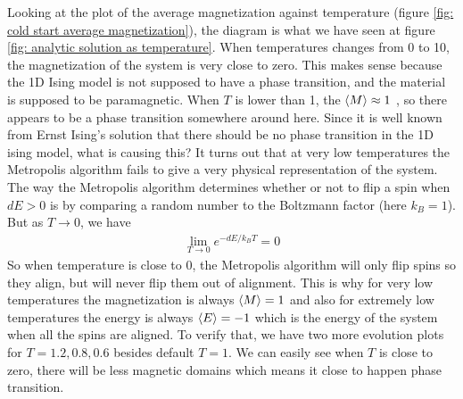 \documentclass[12pt]{article}
\begin{document}
	Looking at the plot of the average magnetization against temperature (figure \ref{fig: cold start average magnetization}), the diagram is what we have seen at figure \ref{fig: analytic solution as temperature}. When temperatures changes from  0 to 10, the magnetization of the system is very close to zero. This makes sense because the 1D Ising model is not supposed to have a phase transition, and the material is supposed to be paramagnetic. When $T$ is lower than 1, the $\braket{M} \approx 1$ , so there appears to be a phase transition somewhere around here. Since it is well known from Ernst Ising’s solution that there should be no phase transition in the 1D ising model, what is causing this? It turns out that at very low temperatures the Metropolis algorithm fails to give a very physical representation of the system. The way the Metropolis algorithm determines whether or not to flip a spin when $dE>0$ is by comparing a random number to the Boltzmann factor (here $k_B=1$). But as $T\to 0$, we have 
	\begin{align*}
		\lim_{T \to 0} e^{-dE/{k_B T}}=0
	\end{align*}
	So when temperature is close to 0, the Metropolis algorithm will only flip spins so they align, but will never flip them out of alignment. This is why for very low temperatures the magnetization is always $\braket{M}=1$ and also for extremely low temperatures the energy is always $\braket{E}=-1$ which is the energy of the system when all the spins are aligned. To verify that, we have two more evolution plots for $T=1.2,0.8,0.6$ besides default $T=1$. We can easily see when $T$ is close to zero, there will be less magnetic domains which means it close to happen phase transition.
	
\end{document}
